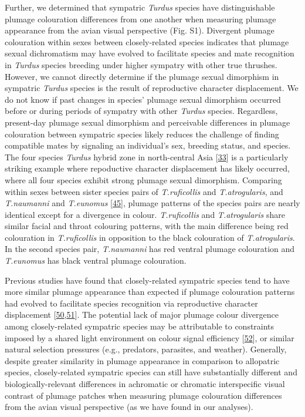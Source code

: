 \documentclass[
  a4paper,
]{article}
\begin{document}
Further, we determined that sympatric \emph{Turdus} species have
distinguishable plumage colouration differences from one another when
measuring plumage appearance from the avian visual perspective (Fig.
S1). Divergent plumage colouration within sexes between closely-related
species indicates that plumage sexual dichromatism may have evolved to
facilitate species and mate recognition in \emph{Turdus} species
breeding under higher sympatry with other true thrushes. However, we
cannot directly determine if the plumage sexual dimorphism in sympatric
\emph{Turdus} species is the result of reproductive character
displacement. We do not know if past changes in species' plumage sexual
dimorphism occurred before or during periods of sympatry with other
\emph{Turdus} species. Regardless, present-day plumage sexual dimorphism
and perceivable differences in plumage colouration between sympatric
species likely reduces the challenge of finding compatible mates by
signaling an individual's sex, breeding status, and species. The four
species \emph{Turdus} hybrid zone in north-central Asia
{[}\protect\hyperlink{ref-mccarthy2006}{33}{]} is a particularly
striking example where repoductive character displacement has likely
occurred, where all four species exhibit strong plumage sexual
dimorphism. Comparing within sexes between sister species pairs of
\emph{T.ruficollis} and \emph{T.atrogularis}, and \emph{T.naumanni} and
\emph{T.eunomus} {[}\protect\hyperlink{ref-nylander2008}{45}{]}, plumage
patterns of the species pairs are nearly identical except for a
divergence in colour. \emph{T.ruficollis} and \emph{T.atrogularis} share
similar facial and throat colouring patterns, with the main difference
being red colouration in \emph{T.ruficollis} in opposition to the black
colouration of \emph{T.atrogularis}. In the second species pair,
\emph{T.naumanni} has red ventral plumage colouration and
\emph{T.eunomus} has black ventral plumage colouration.

Previous studies have found that closely-related sympatric species tend
to have more similar plumage appearance than expected if plumage
colouration patterns had evolved to facilitate species recognition via
reproductive character displacement
{[}\protect\hyperlink{ref-simpson2021}{50},\protect\hyperlink{ref-miller2019}{51}{]}.
The potential lack of major plumage colour divergence among
closely-related sympatric species may be attributable to constraints
imposed by a shared light environment on colour signal efficiency
{[}\protect\hyperlink{ref-mcnaught2002}{52}{]}, or similar natural
selection pressures (e.g., predators, parasites, and weather).
Generally, despite greater similarity in plumage appearance in
comparison to allopatric species, closely-related sympatric species can
still have substantially different and biologically-relevant differences
in achromatic or chromatic interspecific visual contrast of plumage
patches when measuring plumage colouration differences from the avian
visual perspective (as we have found in our analyses).
\end{document}
